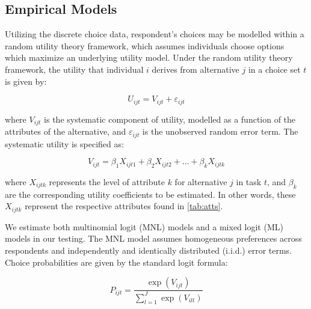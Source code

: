 \documentclass[3p,11pt ]{elsarticle}
\begin{document}
\begin{table}




\end{table}




\subsection{Empirical Models}

Utilizing the discrete choice data,
respondent's choices may be modelled within a random utility theory framework,
which assumes individuals choose options which maximize an underlying utility model\citep{lancsarConductingDiscreteChoice2008}.
Under the random utility theory framework, the utility that individual \( i \) derives from alternative \( j \) in a choice set \( t \) is given by:

\begin{equation}
U_{ijt} = V_{ijt} + \varepsilon_{ijt}
\end{equation}

\noindent where \( V_{ijt} \) is the systematic component of utility, modelled as a function of the attributes of the alternative, and \( \varepsilon_{ijt} \) is the unobserved random error term.
The systematic utility is specified as:

\begin{equation}
V_{ijt} = \beta_1 X_{ijt1} + \beta_2 X_{ijt2} + \ldots + \beta_k X_{ijtk}
\end{equation}

\noindent where \( X_{ijtk} \) represents the level of attribute \( k \) for alternative \( j \) in task \( t \), and \( \beta_k \) are the corresponding utility coefficients to be estimated.
In other words,
these \( X_{ijtk} \) represent the respective attributes found in \ref{tab:atts}.



We estimate both multinomial logit (MNL) models and a mixed logit (ML) models in our testing.
The MNL model assumes homogeneous preferences across respondents and independently and identically distributed (i.i.d.) error terms.
Choice probabilities are given by the standard logit formula:

\begin{equation}
P_{ijt} = \frac{\exp(V_{ijt})}{\sum_{l=1}^{J} \exp(V_{ilt})}
\end{equation}
\end{document}
